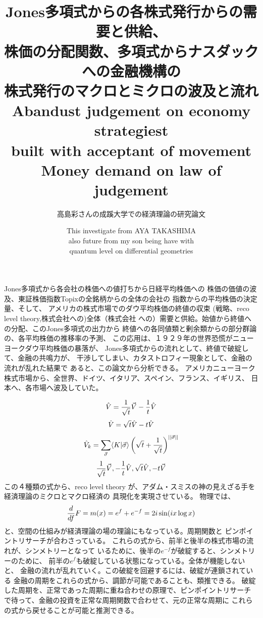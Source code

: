 \documentclass{jsarticle}
\begin{document}
  \title{Jones多項式からの各株式発行からの需要と供給、\\
株価の分配関数、多項式からナスダックへの金融機構の \\
株式発行のマクロとミクロの波及と流れ}
\author{高島彩さんの成蹊大学での経済理論の研究論文}

   Jones多項式から各会社の株価への値打ちから日経平均株価への
   株価の価値の波及、東証株価指数Topixの全銘柄からの全体の会社の
   指数からの平均株価の決定量、そして、
   アメリカの株式市場でのダウ平均株価の終値の収束
   (戦略、reco level theory,株式会社への)全体（株式会社
   への）需要と供給。始値から終値への分配、このJones多項式の出力から
   終値への各同値類と剰余類からの部分群論の、各平均株価の推移率の予測、
   この応用は、１９２９年の世界恐慌がニューヨークダウ平均株価の暴落が、
   Jones多項式からの流れとして、終値で破綻して、金融の共鳴力が、
   干渉してしまい、カタストロフィー現象として、金融の流れが乱れた結果で
   あると、この論文から分析できる。
   アメリカニューヨーク株式市場から、全世界、ドイツ、イタリア、スペイン、フランス、イギリス、
   日本へ、各市場へ波及していた。
  

   $$ \Hat{V} = {1 \over \sqrt{t}} \vec{V} - {1 \over t}\Hat{V} $$
   $$ \Hat{V} = \sqrt{t}\Hat{V} - t \Hat{V} $$
   $$ \Hat{V}_k = \sum_{\vec{\sigma}} \langle K| \vec{\sigma}\rangle
   \left(\sqrt{t} + {1 \over \sqrt{t}} \right)^{||\vec{\sigma}||} $$
   $$ {1 \over \sqrt{t}}\vec{V}, -{1 \over t}\Hat{V},\\ 
   \sqrt{t}\Hat{V}, -t \vec{V} $$
   この４種類の式から、reco level theory
   が、アダム・スミスの神の見えざる手を経済理論のミクロとマクロ経済の
   具現化を実現させている。
   物理では、$$ {d \over df}F = m(x) = e^f + e^{-f} = 2 i \sin (i x \log x) $$
   と、空間の仕組みが経済理論の場の理論にもなっている。周期関数と
   ピンポイントリサーチが合わさっている。
   これらの式から、前半と後半の株式市場の流れが、シンメトリーとなって
   いるために、後半の$ e^{-f} $が破綻すると、シンメトリーのために、
   前半の$ e^f $も破綻している状態になっている。全体が機能しないと、
   金融の流れが乱れていく。この破綻を回避するには、破綻が連鎖されている
   金融の周期をこれらの式から、調節が可能であることも、類推できる。
   破綻した周期を、正常であった周期に重ね合わせの原理で、ピンポイントリサーチ
   で待って、金融の投資を正常な周期関数で合わせて、元の正常な周期に
   これらの式から戻せることが可能と推測できる。

\title{Abandust judgement on economy strategiest \\
built with acceptant of movement \\
Money demand on law of judgement}
\author{This investigate from AYA TAKASHIMA \\
also future from my son being have with \\
quantum level on differential geometries}
\end{document}
